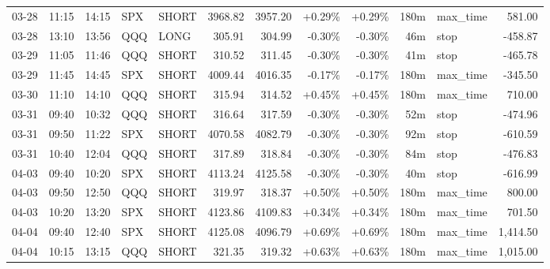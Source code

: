 \documentclass[11pt,a4paper,twoside]{article}
\begin{document}
\begin{center}
\begin{longtable}{>{\color{txtmain}}l l l l l r r r r r >{\color{txtmain}}l r}
03-28 & 11:15 & 14:15 & SPX & SHORT & 3968.82 & 3957.20 & \textcolor{wingreen}{+0.29\%} & \textcolor{wingreen}{+0.29\%} & 180m & max\_time & \textcolor{wingreen}{581.00} \\
03-28 & 13:10 & 13:56 & QQQ & LONG & 305.91 & 304.99 & \textcolor{lossred}{-0.30\%} & \textcolor{lossred}{-0.30\%} & 46m & stop & \textcolor{lossred}{-458.87} \\
03-29 & 11:05 & 11:46 & QQQ & SHORT & 310.52 & 311.45 & \textcolor{lossred}{-0.30\%} & \textcolor{lossred}{-0.30\%} & 41m & stop & \textcolor{lossred}{-465.78} \\
03-29 & 11:45 & 14:45 & SPX & SHORT & 4009.44 & 4016.35 & \textcolor{lossred}{-0.17\%} & \textcolor{lossred}{-0.17\%} & 180m & max\_time & \textcolor{lossred}{-345.50} \\
03-30 & 11:10 & 14:10 & QQQ & SHORT & 315.94 & 314.52 & \textcolor{wingreen}{+0.45\%} & \textcolor{wingreen}{+0.45\%} & 180m & max\_time & \textcolor{wingreen}{710.00} \\
03-31 & 09:40 & 10:32 & QQQ & SHORT & 316.64 & 317.59 & \textcolor{lossred}{-0.30\%} & \textcolor{lossred}{-0.30\%} & 52m & stop & \textcolor{lossred}{-474.96} \\
03-31 & 09:50 & 11:22 & SPX & SHORT & 4070.58 & 4082.79 & \textcolor{lossred}{-0.30\%} & \textcolor{lossred}{-0.30\%} & 92m & stop & \textcolor{lossred}{-610.59} \\
03-31 & 10:40 & 12:04 & QQQ & SHORT & 317.89 & 318.84 & \textcolor{lossred}{-0.30\%} & \textcolor{lossred}{-0.30\%} & 84m & stop & \textcolor{lossred}{-476.83} \\
04-03 & 09:40 & 10:20 & SPX & SHORT & 4113.24 & 4125.58 & \textcolor{lossred}{-0.30\%} & \textcolor{lossred}{-0.30\%} & 40m & stop & \textcolor{lossred}{-616.99} \\
04-03 & 09:50 & 12:50 & QQQ & SHORT & 319.97 & 318.37 & \textcolor{wingreen}{+0.50\%} & \textcolor{wingreen}{+0.50\%} & 180m & max\_time & \textcolor{wingreen}{800.00} \\
04-03 & 10:20 & 13:20 & SPX & SHORT & 4123.86 & 4109.83 & \textcolor{wingreen}{+0.34\%} & \textcolor{wingreen}{+0.34\%} & 180m & max\_time & \textcolor{wingreen}{701.50} \\
04-04 & 09:40 & 12:40 & SPX & SHORT & 4125.08 & 4096.79 & \textcolor{wingreen}{+0.69\%} & \textcolor{wingreen}{+0.69\%} & 180m & max\_time & \textcolor{wingreen}{1,414.50} \\
04-04 & 10:15 & 13:15 & QQQ & SHORT & 321.35 & 319.32 & \textcolor{wingreen}{+0.63\%} & \textcolor{wingreen}{+0.63\%} & 180m & max\_time & \textcolor{wingreen}{1,015.00} \\

\end{longtable}
\end{center}
\end{document}
